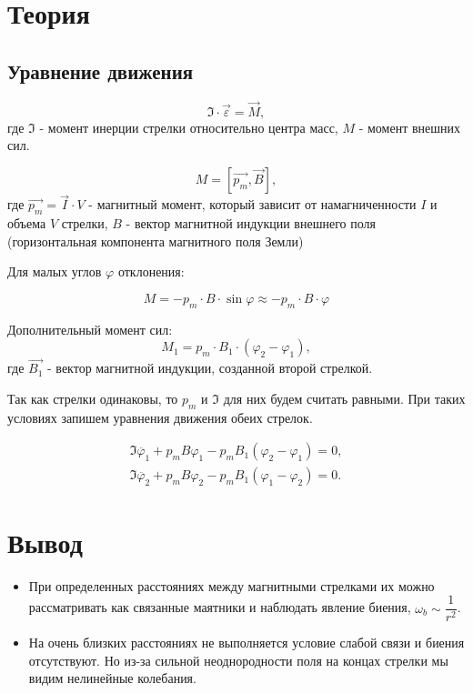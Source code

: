 \documentclass{letask}
\begin{document}
\section{Теория}

\subsection{Уравнение движения}  

\begin{equation}
\mathfrak{I} \cdot \vec{\varepsilon} = \vec{M},
\end{equation}
где $\mathfrak{I}$ - момент инерции стрелки относительно центра масс, $M$ - момент внешних сил.

\begin{equation}
M = \left[ \vec{p_m}, \vec{B} \right],
\end{equation}
где $\vec{p_m} = \vec{I} \cdot V$ - магнитный момент, который зависит от намагниченности $I$ и объема $V$ стрелки, $B$ - вектор магнитной индукции внешнего поля (горизонтальная компонента магнитного поля Земли)

Для малых углов $\varphi$ отклонения:

\begin{equation}
M = - p_m \cdot B \cdot \sin \varphi \approx - p_m \cdot B \cdot \varphi
\end{equation}

Дополнительный момент сил:
\begin{equation}
M_1 = p_m \cdot B_1 \cdot (\varphi_2 - \varphi_1),
\end{equation}
где $\vec{B_1}$ - вектор магнитной индукции, созданной второй стрелкой.

Так как стрелки одинаковы, то $p_m$ и $\mathfrak{I}$ для них будем считать равными. При таких условиях запишем уравнения движения обеих стрелок.

\begin{equation}
\begin{gathered}
\mathfrak{I} \ddot{\varphi_1} + p_m B \varphi_1 - p_m B_1 (\varphi_2 - \varphi_1) = 0, \\
\mathfrak{I} \ddot{\varphi_2} + p_m B \varphi_2 - p_m B_1 (\varphi_1 - \varphi_2) = 0.
\end{gathered}
\end{equation}


\section{Вывод}  

\begin{itemize}
\item При определенных расстояниях между магнитными стрелками их можно рассматривать как связанные маятники и наблюдать явление биения, $\omega_b \sim \dfrac{1}{r^2}$.

\item На очень близких расстояниях не выполняется условие слабой связи и биения отсутствуют. Но из-за сильной неоднородности поля на концах стрелки мы видим нелинейные колебания.
\end{itemize}
\end{document}
